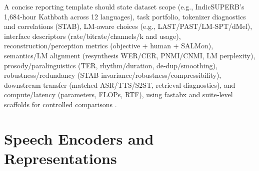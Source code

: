 A concise reporting template should state dataset scope (e.g., IndicSUPERB’s 1,684‑hour Kathbath across 12 languages), task portfolio, tokenizer diagnostics and correlations (STAB), LM‑aware choices (e.g., LAST/PAST/LM‑SPT/dMel), interface descriptors (rate/bitrate/channels/k and usage), reconstruction/perception metrics (objective + human + SALMon), semantics/LM alignment (resynthesis WER/CER, PNMI/CNMI, LM perplexity), prosody/paralinguistics (TER, rhythm/duration, de‑dup/smoothing), robustness/redundancy (STAB invariance/robustness/compressibility), downstream transfer (matched ASR/TTS/S2ST, retrieval diagnostics), and compute/latency (parameters, FLOPs, RTF), using fastabx and suite‑level scaffolds for controlled comparisons \cite{vashishth2024stabspeechtokenizerassessmentbenchmark,turetzky2024lastlanguagemodelawarespeechtokenization,har-tuv2025pastphoneticacousticspeechtokenizer,bai2025dmelspeechtokenizationmadesimple,jo2025lmsptalignedsemanticdistillationspeechto,poli2025fastabxlibraryefficientcomputationabxdis,entry2025indicsuperbspeechprocessinguniversalperf}.

















\section{Speech Encoders and Representations} \label{sec:Speech Encoders and Representations}

